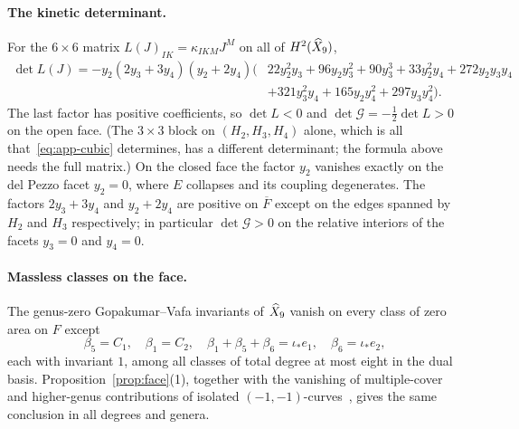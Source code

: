 \paragraph{The kinetic determinant.}
For the $6\times6$ matrix $L(J)_{IK}=\kappa_{IKM}J^M$ on all of $H^2(\widehat X_9)$,
\begin{equation}
\begin{split}
 \det L(J)=-y_2(2y_3+3y_4)(y_2+2y_4)\bigl(&22y_2^2y_3+96y_2y_3^2+90y_3^3
 +33y_2^2y_4+272y_2y_3y_4\\
 &+321y_3^2y_4+165y_2y_4^2+297y_3y_4^2\bigr).
\end{split}
 \label{eq:app-detL}
\end{equation}
The last factor has positive coefficients, so $\det L<0$ and $\det\mathcal G=-\tfrac12\det L>0$ on
the open face. (The $3\times3$ block on $(H_2,H_3,H_4)$ alone, which is all
that~\eqref{eq:app-cubic} determines, has a different determinant; the formula above needs
the full matrix.) On the closed face the factor $y_2$ vanishes exactly on the del Pezzo
facet $y_2=0$, where $E$ collapses and its coupling degenerates. The factors
$2y_3+3y_4$ and $y_2+2y_4$ are positive on $\overline F$ except on the edges spanned by $H_2$
and $H_3$ respectively; in particular $\det\mathcal G>0$ on the relative interiors of the facets
$y_3=0$ and $y_4=0$.

\paragraph{Massless classes on the face.}
The genus-zero Gopakumar--Vafa invariants of $\widehat X_9$ vanish on every class of zero area
on $F$ except
\begin{equation}
 \beta_5=C_1,\quad \beta_1=C_2,\quad \beta_1+\beta_5+\beta_6=\iota_*e_1,\quad
 \beta_6=\iota_*e_2 ,
 \label{eq:app-light}
\end{equation}
each with invariant $1$, among all classes of total degree at most eight in the dual
basis. Proposition~\ref{prop:face}(1), together with the vanishing of multiple-cover
and higher-genus contributions of isolated $(-1,-1)$-curves~\cite{FaberPandharipande:2000,BryanKatzLeung:2001}, gives
the same conclusion in all degrees and genera.

